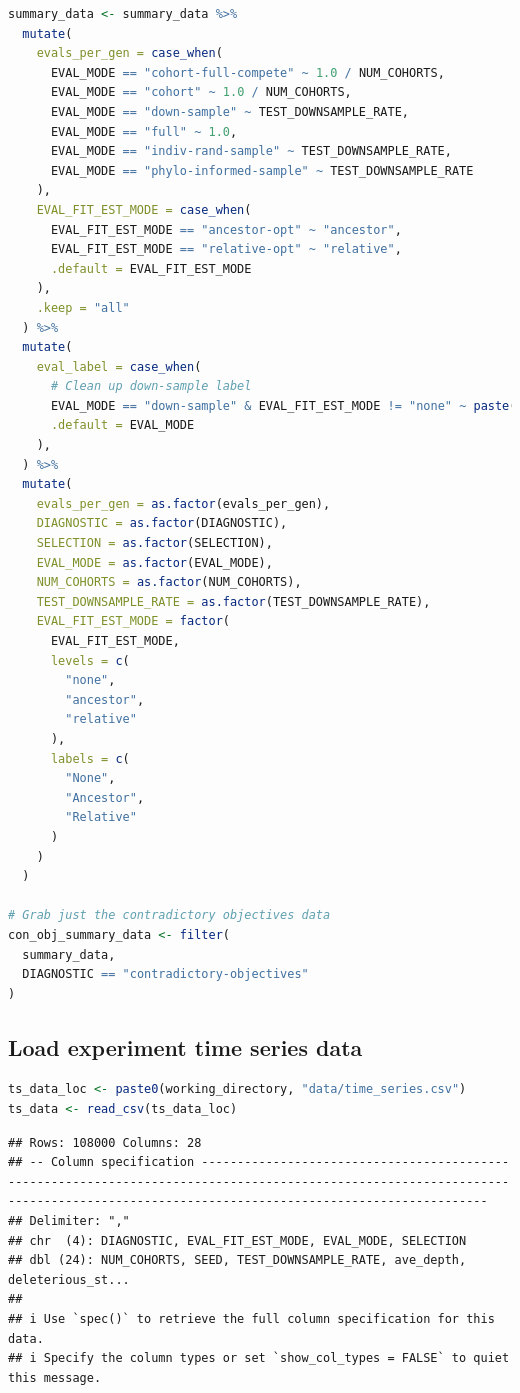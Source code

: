 \documentclass[
]{book}
\begin{document}
\begin{lstlisting}[language=R]
summary_data <- summary_data %>%
  mutate(
    evals_per_gen = case_when(
      EVAL_MODE == "cohort-full-compete" ~ 1.0 / NUM_COHORTS,
      EVAL_MODE == "cohort" ~ 1.0 / NUM_COHORTS,
      EVAL_MODE == "down-sample" ~ TEST_DOWNSAMPLE_RATE,
      EVAL_MODE == "full" ~ 1.0,
      EVAL_MODE == "indiv-rand-sample" ~ TEST_DOWNSAMPLE_RATE,
      EVAL_MODE == "phylo-informed-sample" ~ TEST_DOWNSAMPLE_RATE
    ),
    EVAL_FIT_EST_MODE = case_when(
      EVAL_FIT_EST_MODE == "ancestor-opt" ~ "ancestor",
      EVAL_FIT_EST_MODE == "relative-opt" ~ "relative",
      .default = EVAL_FIT_EST_MODE
    ),
    .keep = "all"
  ) %>%
  mutate(
    eval_label = case_when(
      # Clean up down-sample label
      EVAL_MODE == "down-sample" & EVAL_FIT_EST_MODE != "none" ~ paste("down-sample", EVAL_FIT_EST_MODE, sep="-"),
      .default = EVAL_MODE
    ),
  ) %>%
  mutate(
    evals_per_gen = as.factor(evals_per_gen),
    DIAGNOSTIC = as.factor(DIAGNOSTIC),
    SELECTION = as.factor(SELECTION),
    EVAL_MODE = as.factor(EVAL_MODE),
    NUM_COHORTS = as.factor(NUM_COHORTS),
    TEST_DOWNSAMPLE_RATE = as.factor(TEST_DOWNSAMPLE_RATE),
    EVAL_FIT_EST_MODE = factor(
      EVAL_FIT_EST_MODE,
      levels = c(
        "none",
        "ancestor",
        "relative"
      ),
      labels = c(
        "None",
        "Ancestor",
        "Relative"
      )
    )
  )

# Grab just the contradictory objectives data
con_obj_summary_data <- filter(
  summary_data,
  DIAGNOSTIC == "contradictory-objectives"
)
\end{lstlisting}

\hypertarget{load-experiment-time-series-data-1}{%
\subsection{Load experiment time series data}\label{load-experiment-time-series-data-1}}

\begin{lstlisting}[language=R]
ts_data_loc <- paste0(working_directory, "data/time_series.csv")
ts_data <- read_csv(ts_data_loc)
\end{lstlisting}

\begin{lstlisting}
## Rows: 108000 Columns: 28
## -- Column specification ------------------------------------------------------------------------------------------------------------------------------------------------------------------------------------
## Delimiter: ","
## chr  (4): DIAGNOSTIC, EVAL_FIT_EST_MODE, EVAL_MODE, SELECTION
## dbl (24): NUM_COHORTS, SEED, TEST_DOWNSAMPLE_RATE, ave_depth, deleterious_st...
## 
## i Use `spec()` to retrieve the full column specification for this data.
## i Specify the column types or set `show_col_types = FALSE` to quiet this message.
\end{lstlisting}
\end{document}
